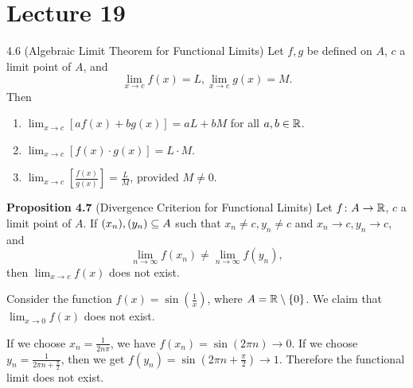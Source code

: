 \documentclass[class=article, crop=false]{standalone}
\begin{document}
  \section{Lecture 19}
  \begin{theorem}{4.6 (Algebraic Limit Theorem for Functional Limits)}
    Let $f, g$ be defined on $A$, $c$ a limit point of $A$, and
    \[
      \lim_{x\to c} f(x) = L, \lim_{x\to c} g(x) = M.
    \]
    Then
    \begin{enumerate}[label=(\roman*)]
      \item $\displaystyle \lim_{x\to c} [af(x) + bg(x)] = aL + bM$ for all $a, b\in\mathbb{R}$.
      \item $\displaystyle \lim_{x\to c} [f(x)\cdot g(x)] = L\cdot M$.
      \item $\displaystyle \lim_{x\to c} \left[\frac{f(x)}{g(x)}\right] = \frac{L}{M}$, provided $M\neq 0$.
    \end{enumerate}
  \end{theorem}
  \textbf{Proposition 4.7} (Divergence Criterion for Functional Limits) Let $f\colon A\to \mathbb{R}$, $c$ a limit point of $A$. If $(x_n), (y_n)\subseteq A$ such that $x_n\neq c, y_n\neq c$ and $x_n\to c, y_n\to c$, and
  \[
    \lim_{n\to \infty} f(x_n)\neq \lim_{n\to \infty} f(y_n),
  \]
  then $\displaystyle\lim_{x\to c} f(x)$ does not exist.
  \begin{example}{}
    Consider the function $f(x) = \sin (\frac{1}{x})$, where $A = \mathbb{R}\setminus\left\{0\right\}$. We claim that $\displaystyle\lim_{x\to 0} f(x)$ does not exist. \par
    If we choose $x_n = \frac{1}{2n\pi}$, we have $f(x_n) = \sin(2\pi n)\to 0$. If we choose $y_n = \frac{1}{2\pi n + \frac{\pi}{2}}$, then we get $f(y_n) = \sin(2\pi n + \frac{\pi}{2})\to 1$. Therefore the functional limit does not exist.
  \end{example}
\end{document}
